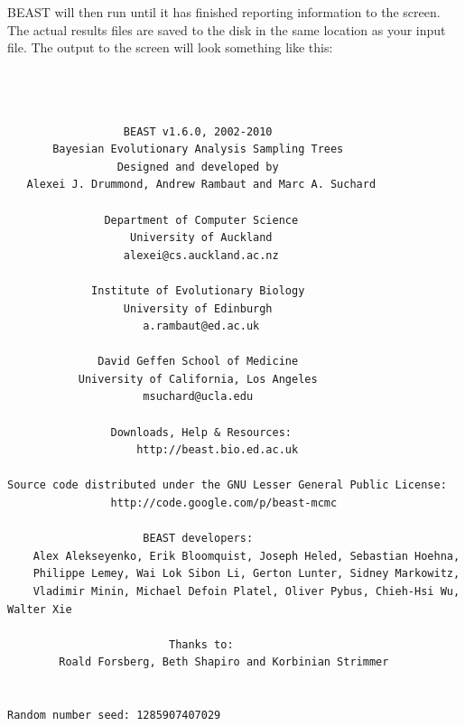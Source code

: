 \documentclass[12pt]{article}
\begin{document}
\medskip{}

BEAST will then run until it has finished
reporting information to the screen. The actual results files are
saved to the disk in the same location as your input file. The output to the screen will
look something like this: 

{\scriptsize   
\begin{verbatim}



                  BEAST v1.6.0, 2002-2010
       Bayesian Evolutionary Analysis Sampling Trees
                 Designed and developed by
   Alexei J. Drummond, Andrew Rambaut and Marc A. Suchard
                              
               Department of Computer Science
                   University of Auckland
                  alexei@cs.auckland.ac.nz
                              
             Institute of Evolutionary Biology
                  University of Edinburgh
                     a.rambaut@ed.ac.uk
                              
              David Geffen School of Medicine
           University of California, Los Angeles
                     msuchard@ucla.edu
                              
                Downloads, Help & Resources:
                 	http://beast.bio.ed.ac.uk
                              
Source code distributed under the GNU Lesser General Public License:
            	http://code.google.com/p/beast-mcmc
                              
                     BEAST developers:
	Alex Alekseyenko, Erik Bloomquist, Joseph Heled, Sebastian Hoehna, 
	Philippe Lemey, Wai Lok Sibon Li, Gerton Lunter, Sidney Markowitz, 
	Vladimir Minin, Michael Defoin Platel, Oliver Pybus, Chieh-Hsi Wu, Walter Xie
                              
                         Thanks to:
    	Roald Forsberg, Beth Shapiro and Korbinian Strimmer


Random number seed: 1285907407029


\end{verbatim}}
\end{document}
